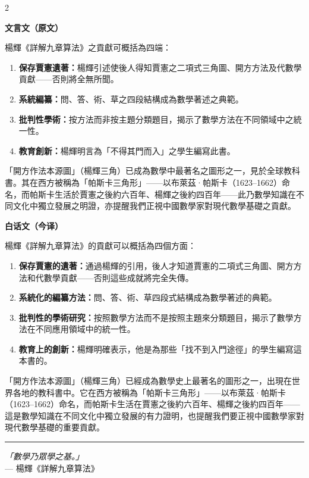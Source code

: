 \documentclass[11pt,a4paper]{article}
\newcommand{\longline}{\noindent\rule{\textwidth}{0.4pt}}
\newcommand{\LeftLabel}{\begin{center}\textcolor{sectioncolor}{\small\textbf{文言文（原文）}}\end{center}\vspace{-0.5em}}
\newcommand{\RightLabel}{\begin{center}\textcolor{sectioncolor}{\small\textbf{白话文（今译）}}\end{center}\vspace{-0.5em}}
\begin{document}
\begin{paracol}{2}
\LeftLabel
{\small
楊輝《詳解九章算法》之貢獻可概括為四端：

\begin{enumerate}[noitemsep,label=\arabic*.,leftmargin=1.5em]
\item \textbf{保存賈憲遺著：}楊輝引述使後人得知賈憲之二項式三角圖、開方方法及代數學貢獻——否則將全無所聞。

\item \textbf{系統編纂：}問、答、術、草之四段結構成為數學著述之典範。

\item \textbf{批判性學術：}按方法而非按主題分類題目，揭示了數學方法在不同領域中之統一性。

\item \textbf{教育創新：}楊輝明言為「不得其門而入」之學生編寫此書。
\end{enumerate}

「開方作法本源圖」（楊輝三角）已成為數學中最著名之圖形之一，見於全球教科書。其在西方被稱為「帕斯卡三角形」——以布萊茲·帕斯卡（1623--1662）命名，而帕斯卡生活於賈憲之後約六百年、楊輝之後約四百年——此乃數學知識在不同文化中獨立發展之明證，亦提醒我們正視中國數學家對現代數學基礎之貢獻。
}

\switchcolumn
\RightLabel
{\small
楊輝《詳解九章算法》的貢獻可以概括為四個方面：

\begin{enumerate}[noitemsep,label=\arabic*.,leftmargin=1.5em]
\item \textbf{保存賈憲的遺著：}通過楊輝的引用，後人才知道賈憲的二項式三角圖、開方方法和代數學貢獻——否則這些成就將完全失傳。

\item \textbf{系統化的編纂方法：}問、答、術、草四段式結構成為數學著述的典範。

\item \textbf{批判性的學術研究：}按照數學方法而不是按照主題來分類題目，揭示了數學方法在不同應用領域中的統一性。

\item \textbf{教育上的創新：}楊輝明確表示，他是為那些「找不到入門途徑」的學生編寫這本書的。
\end{enumerate}

「開方作法本源圖」（楊輝三角）已經成為數學史上最著名的圖形之一，出現在世界各地的教科書中。它在西方被稱為「帕斯卡三角形」——以布萊茲·帕斯卡（1623--1662）命名，而帕斯卡生活在賈憲之後約六百年、楊輝之後約四百年——這是數學知識在不同文化中獨立發展的有力證明，也提醒我們要正視中國數學家對現代數學基礎的重要貢獻。
}

\end{paracol}

\vspace{2em}

\begin{center}
\longline
\end{center}

\vspace{1em}

\begin{center}
{\textit{「數學乃眾學之基。」}}\\[0.5em]
--- 楊輝《詳解九章算法》
\end{center}
\end{document}
